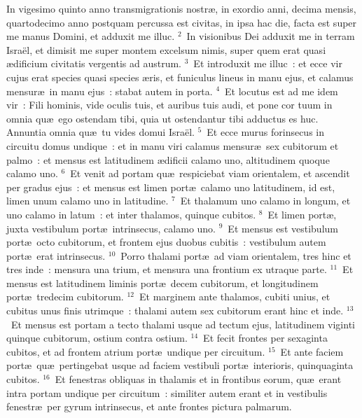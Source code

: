 \bchapter
\lettrine[lines=3,image=true,loversize=0.05,lraise=-0.03]{I}{}n vigesimo quinto anno transmigrationis nostr\ae , in exordio anni, decima mensis, quartodecimo anno postquam percussa est civitas, in ipsa hac die, facta est super me manus Domini, et adduxit me illuc.
${}^{2}$~In visionibus Dei adduxit me in terram Isra\"el, et dimisit me super montem excelsum nimis, super quem erat quasi \ae dificium civitatis vergentis ad austrum.
${}^{3}$~Et introduxit me illuc~: et ecce vir cujus erat species quasi species \ae ris, et funiculus lineus in manu ejus, et calamus mensur\ae\ in manu ejus~: stabat autem in porta.
${}^{4}$~Et locutus est ad me idem vir~: Fili hominis, vide oculis tuis, et auribus tuis audi, et pone cor tuum in omnia qu\ae\ ego ostendam tibi, quia ut ostendantur tibi adductus es huc. Annuntia omnia qu\ae\ tu vides domui Isra\"el.
${}^{5}$~Et ecce murus forinsecus in circuitu domus undique~: et in manu viri calamus mensur\ae\ sex cubitorum et palmo~: et mensus est latitudinem \ae dificii calamo uno, altitudinem quoque calamo uno.
${}^{6}$~Et venit ad portam qu\ae\ respiciebat viam orientalem, et ascendit per gradus ejus~: et mensus est limen port\ae\ calamo uno latitudinem, id est, limen unum calamo uno in latitudine.
${}^{7}$~Et thalamum uno calamo in longum, et uno calamo in latum~: et inter thalamos, quinque cubitos.
${}^{8}$~Et limen port\ae , juxta vestibulum port\ae\ intrinsecus, calamo uno.
${}^{9}$~Et mensus est vestibulum port\ae\ octo cubitorum, et frontem ejus duobus cubitis~: vestibulum autem port\ae\ erat intrinsecus.
${}^{10}$~Porro thalami port\ae\ ad viam orientalem, tres hinc et tres inde~: mensura una trium, et mensura una frontium ex utraque parte.
${}^{11}$~Et mensus est latitudinem liminis port\ae\ decem cubitorum, et longitudinem port\ae\ tredecim cubitorum.
${}^{12}$~Et marginem ante thalamos, cubiti unius, et cubitus unus finis utrimque~: thalami autem sex cubitorum erant hinc et inde.
${}^{13}$~Et mensus est portam a tecto thalami usque ad tectum ejus, latitudinem viginti quinque cubitorum, ostium contra ostium.
${}^{14}$~Et fecit frontes per sexaginta cubitos, et ad frontem atrium port\ae\ undique per circuitum.
${}^{15}$~Et ante faciem port\ae\ qu\ae\ pertingebat usque ad faciem vestibuli port\ae\ interioris, quinquaginta cubitos.
${}^{16}$~Et fenestras obliquas in thalamis et in frontibus eorum, qu\ae\ erant intra portam undique per circuitum~: similiter autem erant et in vestibulis fenestr\ae\ per gyrum intrinsecus, et ante frontes pictura palmarum.



